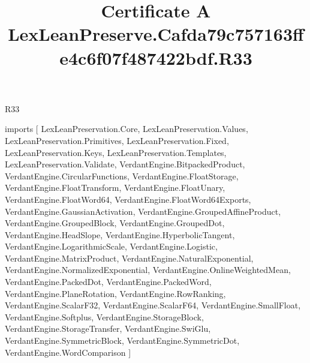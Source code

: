 \begin{lexlean}{R33}
\title{Certificate A LexLeanPreserve.Cafda79c757163ffe4c6f07f487422bdf.R33}
\begin{coremodule}
imports [
  LexLeanPreservation.Core,
  LexLeanPreservation.Values,
  LexLeanPreservation.Primitives,
  LexLeanPreservation.Fixed,
  LexLeanPreservation.Keys,
  LexLeanPreservation.Templates,
  LexLeanPreservation.Validate,
  VerdantEngine.BitpackedProduct,
  VerdantEngine.CircularFunctions,
  VerdantEngine.FloatStorage,
  VerdantEngine.FloatTransform,
  VerdantEngine.FloatUnary,
  VerdantEngine.FloatWord64,
  VerdantEngine.FloatWord64Exports,
  VerdantEngine.GaussianActivation,
  VerdantEngine.GroupedAffineProduct,
  VerdantEngine.GroupedBlock,
  VerdantEngine.GroupedDot,
  VerdantEngine.HeadSlope,
  VerdantEngine.HyperbolicTangent,
  VerdantEngine.LogarithmicScale,
  VerdantEngine.Logistic,
  VerdantEngine.MatrixProduct,
  VerdantEngine.NaturalExponential,
  VerdantEngine.NormalizedExponential,
  VerdantEngine.OnlineWeightedMean,
  VerdantEngine.PackedDot,
  VerdantEngine.PackedWord,
  VerdantEngine.PlaneRotation,
  VerdantEngine.RowRanking,
  VerdantEngine.ScalarF32,
  VerdantEngine.ScalarF64,
  VerdantEngine.SmallFloat,
  VerdantEngine.Softplus,
  VerdantEngine.StorageBlock,
  VerdantEngine.StorageTransfer,
  VerdantEngine.SwiGlu,
  VerdantEngine.SymmetricBlock,
  VerdantEngine.SymmetricDot,
  VerdantEngine.WordComparison
]


\end{coremodule}
\end{lexlean}
